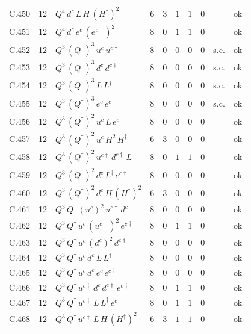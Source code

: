 {\begin{longtable}{@{}ll>{\raggedright\arraybackslash}p{6.4cm}rrllllr@{}}
C.450 & 12 & $Q^{4}\,d^c\,L\,H\,(H^\dagger)^{2}$ & 6 & 3 & $1$ & $1$ & $0$ &  & ok \\
C.451 & 12 & $Q^{4}\,d^c\,e^c\,(e^{c\dagger})^{2}$ & 8 & 0 & $1$ & $1$ & $0$ &  & ok \\
C.452 & 12 & $Q^{3}\,(Q^\dagger)^{3}\,u^c\,u^{c\dagger}$ & 8 & 0 & $0$ & $0$ & $0$ & s.c. & ok \\
C.453 & 12 & $Q^{3}\,(Q^\dagger)^{3}\,d^c\,d^{c\dagger}$ & 8 & 0 & $0$ & $0$ & $0$ & s.c. & ok \\
C.454 & 12 & $Q^{3}\,(Q^\dagger)^{3}\,L\,L^\dagger$ & 8 & 0 & $0$ & $0$ & $0$ & s.c. & ok \\
C.455 & 12 & $Q^{3}\,(Q^\dagger)^{3}\,e^c\,e^{c\dagger}$ & 8 & 0 & $0$ & $0$ & $0$ & s.c. & ok \\
C.456 & 12 & $Q^{3}\,(Q^\dagger)^{2}\,u^c\,L\,e^c$ & 8 & 0 & $0$ & $0$ & $0$ &  & ok \\
C.457 & 12 & $Q^{3}\,(Q^\dagger)^{2}\,u^c\,H^{2}\,H^\dagger$ & 6 & 3 & $0$ & $0$ & $0$ &  & ok \\
C.458 & 12 & $Q^{3}\,(Q^\dagger)^{2}\,u^{c\dagger}\,d^{c\dagger}\,L$ & 8 & 0 & $1$ & $1$ & $0$ &  & ok \\
C.459 & 12 & $Q^{3}\,(Q^\dagger)^{2}\,d^c\,L^\dagger\,e^{c\dagger}$ & 8 & 0 & $0$ & $0$ & $0$ &  & ok \\
C.460 & 12 & $Q^{3}\,(Q^\dagger)^{2}\,d^c\,H\,(H^\dagger)^{2}$ & 6 & 3 & $0$ & $0$ & $0$ &  & ok \\
C.461 & 12 & $Q^{3}\,Q^\dagger\,(u^c)^{2}\,u^{c\dagger}\,d^c$ & 8 & 0 & $0$ & $0$ & $0$ &  & ok \\
C.462 & 12 & $Q^{3}\,Q^\dagger\,u^c\,(u^{c\dagger})^{2}\,e^{c\dagger}$ & 8 & 0 & $1$ & $1$ & $0$ &  & ok \\
C.463 & 12 & $Q^{3}\,Q^\dagger\,u^c\,(d^c)^{2}\,d^{c\dagger}$ & 8 & 0 & $0$ & $0$ & $0$ &  & ok \\
C.464 & 12 & $Q^{3}\,Q^\dagger\,u^c\,d^c\,L\,L^\dagger$ & 8 & 0 & $0$ & $0$ & $0$ &  & ok \\
C.465 & 12 & $Q^{3}\,Q^\dagger\,u^c\,d^c\,e^c\,e^{c\dagger}$ & 8 & 0 & $0$ & $0$ & $0$ &  & ok \\
C.466 & 12 & $Q^{3}\,Q^\dagger\,u^{c\dagger}\,d^c\,d^{c\dagger}\,e^{c\dagger}$ & 8 & 0 & $1$ & $1$ & $0$ &  & ok \\
C.467 & 12 & $Q^{3}\,Q^\dagger\,u^{c\dagger}\,L\,L^\dagger\,e^{c\dagger}$ & 8 & 0 & $1$ & $1$ & $0$ &  & ok \\
C.468 & 12 & $Q^{3}\,Q^\dagger\,u^{c\dagger}\,L\,H\,(H^\dagger)^{2}$ & 6 & 3 & $1$ & $1$ & $0$ &  & ok \\

\end{longtable}}

